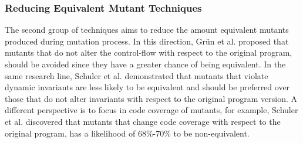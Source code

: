 






\subsubsection{Reducing Equivalent Mutant Techniques}

The second group of techniques aims to reduce the amount equivalent mutants produced during mutation process.
In this direction, Gr\"{u}n et al. \cite{grun2009impact} proposed that mutants that do not alter the control-flow with respect to the original program, should be avoided since they have a greater chance of being equivalent.
In the same research line, Schuler et al. \cite{schuler2009efficient} demonstrated that mutants that violate dynamic invariants are less likely to be equivalent and should be preferred over those that do not alter invariants with respect to the original program version.
A different perspective is to focus in code coverage of mutants, for example, Schuler et al. \cite{schuler2010covering,schuler2013covering} discovered that mutants that change code coverage with respect to the original program, has a likelihood of 68\%-70\% to be non-equivalent.

